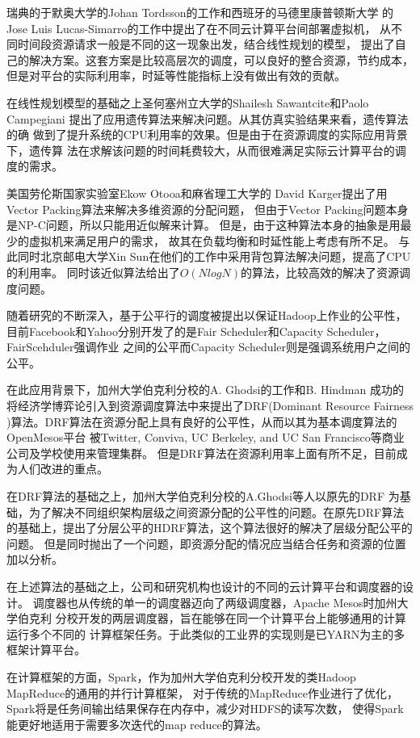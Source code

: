 瑞典的于默奥大学的Johan Tordsson的工作和西班牙的马德里康普顿斯大学
的Jose Luis Lucas-Simarro的工作中提出了在不同云计算平台间部署虚拟机，
从不同时间段资源请求一般是不同的这一现象出发，结合线性规划的模型，
提出了自己的解决方案。这套方案是比较高层次的调度，可以良好的整合资源，节约成本，
但是对平台的实际利用率，时延等性能指标上没有做出有效的贡献。

在线性规划模型的基础之上圣何塞州立大学的Shailesh Sawantcite和Paolo Campegiani
提出了应用遗传算法来解决问题。从其仿真实验结果来看，遗传算法的确
做到了提升系统的CPU利用率的效果。但是由于在资源调度的实际应用背景下，遗传算
法在求解该问题的时间耗费较大，从而很难满足实际云计算平台的调度的需求。

美国劳伦斯国家实验室Ekow Otooa和麻省理工大学的
David Karger提出了用Vector Packing算法来解决多维资源的分配问题，
但由于Vector Packing问题本身是NP-C问题，所以只能用近似解来计算。
但是，由于这种算法本身的抽象是用最少的虚拟机来满足用户的需求，
故其在负载均衡和时延性能上考虑有所不足。
与此同时北京邮电大学Xin Sun在他们的工作中采用背包算法解决问题，提高了CPU的利用率。
同时该近似算法给出了$O(NlogN)$的算法，比较高效的解决了资源调度问题。

随着研究的不断深入，基于公平行的调度被提出以保证Hadoop上作业的公平性，
目前Facebook和Yahoo分别开发了的是Fair Scheduler和Capacity Scheduler，FairScehduler强调作业
之间的公平而Capacity Scheduler则是强调系统用户之间的公平。

在此应用背景下，加州大学伯克利分校的A. Ghodsi的工作和B. Hindman
成功的将经济学博弈论引入到资源调度算法中来提出了DRF(Dominant Resource Fairness
)算法。DRF算法在资源分配上具有良好的公平性，从而以其为基本调度算法的OpenMesos平台
被Twitter, Conviva, UC Berkeley, and UC San Francisco等商业公司及学校使用来管理集群。
但是DRF算法在资源利用率上面有所不足，目前成为人们改进的重点。

在DRF算法的基础之上，加州大学伯克利分校的A.Ghodsi等人以原先的DRF
为基础，为了解决不同组织架构层级之间资源分配的公平性的问题。在原先DRF算法
的基础上，提出了分层公平的HDRF算法，这个算法很好的解决了层级分配公平的问题。
但是同时抛出了一个问题，即资源分配的情况应当结合任务和资源的位置加以分析。

在上述算法的基础之上，公司和研究机构也设计的不同的云计算平台和调度器的设计。
调度器也从传统的单一的调度器迈向了两级调度器，Apache Mesos时加州大学伯克利
分校开发的两层调度器，旨在能够在同一个计算平台上能够通用的计算运行多个不同的
计算框架任务。于此类似的工业界的实现则是已YARN为主的多框架计算平台。

在计算框架的方面，Spark，作为加州大学伯克利分校开发的类Hadoop MapReduce的通用的并行计算框架，
对于传统的MapReduce作业进行了优化，Spark将是任务间输出结果保存在内存中，减少对HDFS的读写次数，
使得Spark能更好地适用于需要多次迭代的map reduce的算法。

